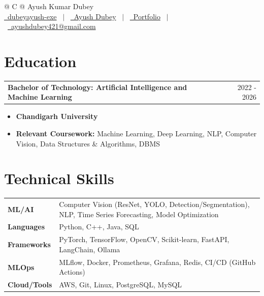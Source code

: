 \documentclass[a4paper,10pt]{article}
\makeatletter
\newenvironment{joblong}[2]
    {
    \begin{tabularx}{\linewidth}{@{}l >{\raggedright\arraybackslash}X r@{}}
    \textbf{#1} & \hfill &  #2 \\[1.0pt]
    \end{tabularx}
    \begin{minipage}[t]{\linewidth}
    \begin{itemize}[nosep,after=\strut, leftmargin=1em, itemsep=1.5pt]
    }
    {
    \end{itemize}
    \end{minipage}    
    }
\makeatother
\begin{document}
\pagestyle{empty}

\begin{tabularx}{\linewidth}{@{} C @{}}
\huge{Ayush Kumar Dubey} \\[3.5pt]
\href{https://github.com/dubeyayush-exe}{\raisebox{-0.05\height}\faGithub\ dubeyayush-exe} \ $|$ \ 
\href{https://www.linkedin.com/in/ayush-dubey-b445a123a}{\raisebox{-0.05\height}\faLinkedin\ Ayush Dubey} \ $|$ \ 
\href{https://github.com/dubeyayush-exe/dubeyayush-exe.github.io}{\raisebox{-0.05\height}\faGlobe \ Portfolio} \ $|$ \ 
\href{mailto:ayushdubey421@gmail.com}{\raisebox{-0.05\height}\faEnvelope \ ayushdubey421@gmail.com} \\
\end{tabularx}

\section{Education}
\begin{joblong}{Bachelor of Technology: Artificial Intelligence and Machine Learning} {2022 - 2026}
\item[] \textbf{Chandigarh University}
\item[] \textbf{Relevant Coursework:} Machine Learning, Deep Learning, NLP, Computer Vision, Data Structures \& Algorithms, DBMS
\end{joblong}

\section{Technical Skills}
\begin{tabularx}{\linewidth}{@{}l X@{}}
\textbf{ML/AI} & Computer Vision (ResNet, YOLO, Detection/Segmentation), NLP, Time Series Forecasting, Model Optimization \\
\textbf{Languages} & Python, C++, Java, SQL \\
\textbf{Frameworks} & PyTorch, TensorFlow, OpenCV, Scikit-learn, FastAPI, LangChain, Ollama \\
\textbf{MLOps} & MLflow, Docker, Prometheus, Grafana, Redis, CI/CD (GitHub Actions) \\
\textbf{Cloud/Tools} & AWS, Git, Linux, PostgreSQL, MySQL \\
\end{tabularx}
\end{document}
